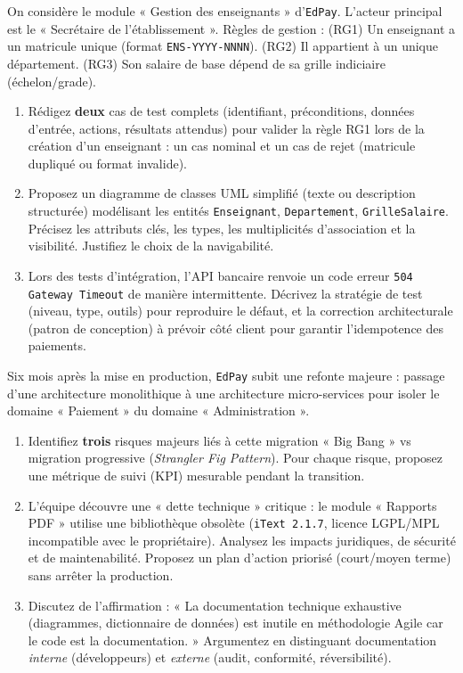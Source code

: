 \documentclass[11pt]{article}
\begin{document}
\begin{exercice}
On considère le module « Gestion des enseignants » d'\texttt{EdPay}. L'acteur principal est le « Secrétaire de l'établissement ». Règles de gestion : (RG1) Un enseignant a un matricule unique (format \texttt{ENS-YYYY-NNNN}). (RG2) Il appartient à un unique département. (RG3) Son salaire de base dépend de sa grille indiciaire (échelon/grade).
\begin{enumerate}
    \item [2 pts] Rédigez \textbf{deux} cas de test complets (identifiant, préconditions, données d'entrée, actions, résultats attendus) pour valider la règle RG1 lors de la création d'un enseignant : un cas nominal et un cas de rejet (matricule dupliqué ou format invalide).
    \item [2 pts] Proposez un diagramme de classes UML simplifié (texte ou description structurée) modélisant les entités \texttt{Enseignant}, \texttt{Departement}, \texttt{GrilleSalaire}. Précisez les attributs clés, les types, les multiplicités d'association et la visibilité. Justifiez le choix de la navigabilité.
    \item [2 pts] Lors des tests d'intégration, l'API bancaire renvoie un code erreur \texttt{504 Gateway Timeout} de manière intermittente. Décrivez la stratégie de test (niveau, type, outils) pour reproduire le défaut, et la correction architecturale (patron de conception) à prévoir côté client pour garantir l'idempotence des paiements.
\end{enumerate}
\end{exercice}

\begin{exercice}
Six mois après la mise en production, \texttt{EdPay} subit une refonte majeure : passage d'une architecture monolithique à une architecture micro-services pour isoler le domaine « Paiement » du domaine « Administration ».
\begin{enumerate}
    \item [2 pts] Identifiez \textbf{trois} risques majeurs liés à cette migration « Big Bang » vs migration progressive (\textit{Strangler Fig Pattern}). Pour chaque risque, proposez une métrique de suivi (KPI) mesurable pendant la transition.
    \item [2 pts] L'équipe découvre une « dette technique » critique : le module « Rapports PDF » utilise une bibliothèque obsolète (\texttt{iText 2.1.7}, licence LGPL/MPL incompatible avec le propriétaire). Analysez les impacts juridiques, de sécurité et de maintenabilité. Proposez un plan d'action priorisé (court/moyen terme) sans arrêter la production.
    \item [2 pts] Discutez de l'affirmation : « La documentation technique exhaustive (diagrammes, dictionnaire de données) est inutile en méthodologie Agile car le code est la documentation. » Argumentez en distinguant documentation \textit{interne} (développeurs) et \textit{externe} (audit, conformité, réversibilité).
\end{enumerate}
\end{exercice}
\end{document}
